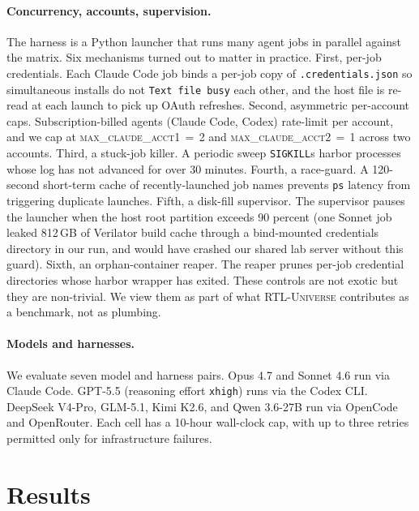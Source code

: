 \documentclass{article}
\begin{document}
\paragraph{Concurrency, accounts, supervision.}
The harness is a Python launcher that runs many agent jobs in parallel against the matrix.
Six mechanisms turned out to matter in practice. First, per-job credentials. Each Claude Code
job binds a per-job copy of \texttt{.credentials.json} so simultaneous installs do not
\texttt{Text~file~busy} each other, and the host file is re-read at each launch to pick up
OAuth refreshes. Second, asymmetric per-account caps. Subscription-billed agents (Claude
Code, Codex) rate-limit per account, and we cap at \textsc{max\_claude\_acct1}\,$=$\,2 and
\textsc{max\_claude\_acct2}\,$=$\,1 across two accounts. Third, a stuck-job killer. A
periodic sweep \texttt{SIGKILL}s harbor processes whose log has not advanced for over 30
minutes. Fourth, a race-guard. A 120-second short-term cache of recently-launched job names
prevents \texttt{ps} latency from triggering duplicate launches. Fifth, a disk-fill
supervisor. The supervisor pauses the launcher when the host root partition exceeds 90
percent (one Sonnet job leaked 812\,GB of Verilator build cache through a bind-mounted
credentials directory in our run, and would have crashed our shared lab server without this
guard). Sixth, an orphan-container reaper. The reaper prunes per-job credential directories
whose harbor wrapper has exited. These controls are not exotic but they are non-trivial. We
view them as part of what \textsc{RTL-Universe} contributes as a benchmark, not as plumbing.

\paragraph{Models and harnesses.}
We evaluate seven model and harness pairs. Opus 4.7 and Sonnet 4.6 run via Claude Code.
GPT-5.5 (reasoning effort \texttt{xhigh}) runs via the Codex CLI. DeepSeek V4-Pro, GLM-5.1,
Kimi K2.6, and Qwen 3.6-27B run via OpenCode and OpenRouter. Each cell has a 10-hour
wall-clock cap, with up to three retries permitted only for infrastructure failures.

\section{Results}
\label{sec:results}
\end{document}
